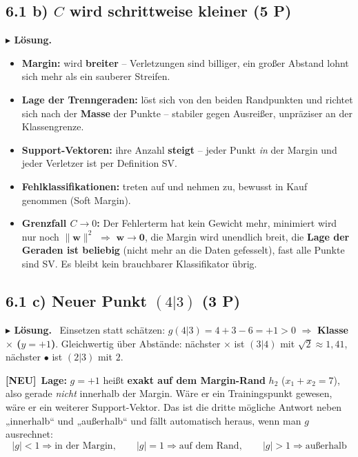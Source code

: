 \documentclass[10pt,a4paper]{article}
\newcommand{\pkt}[1]{\hfill\textbf{(#1 P)}}
\newcommand{\neu}{{\color{neurot}\footnotesize\bfseries[NEU]}\ }
\newenvironment{loes}%
  {\par\vspace{2pt}\begingroup\small\noindent\textbf{\color{loesfarbe}$\blacktriangleright$ Lösung.}\ }%
  {\endgroup\par\vspace{5pt}}
\begin{document}
\subsection*{6.1 b) $C$ wird schrittweise kleiner \pkt{5}}

\begin{loes}
\begin{itemize}
\item \textbf{Margin:} wird \textbf{breiter} -- Verletzungen sind billiger, ein großer Abstand
  lohnt sich mehr als ein sauberer Streifen.
\item \textbf{Lage der Trenngeraden:} löst sich von den beiden Randpunkten und richtet sich nach
  der \textbf{Masse} der Punkte -- stabiler gegen Ausreißer, unpräziser an der Klassengrenze.
\item \textbf{Support-Vektoren:} ihre Anzahl \textbf{steigt} -- jeder Punkt \emph{in} der Margin
  und jeder Verletzer ist per Definition SV.
\item \textbf{Fehlklassifikationen:} treten auf und nehmen zu, bewusst in Kauf genommen
  (Soft Margin).
\item \textbf{Grenzfall $C\to0$:} Der Fehlerterm hat kein Gewicht mehr, minimiert wird nur noch
  $\|\boldsymbol{w}\|^2$ $\Rightarrow$ $\boldsymbol{w}\to\boldsymbol{0}$, die Margin wird unendlich
  breit, die \textbf{Lage der Geraden ist beliebig} (nicht mehr an die Daten gefesselt), fast alle
  Punkte sind SV. Es bleibt kein brauchbarer Klassifikator übrig.
\end{itemize}
\end{loes}

\subsection*{6.1 c) Neuer Punkt $(4|3)$ \pkt{3}}

\begin{loes}
Einsetzen statt schätzen: $g(4|3) = 4+3-6 = +1 > 0$ $\Rightarrow$ \textbf{Klasse $\times$
($y=+1$)}. Gleichwertig über Abstände: nächster $\times$ ist $(3|4)$ mit $\sqrt2\approx1{,}41$,
nächster $\bullet$ ist $(2|3)$ mit $2$.

\neu \textbf{Lage:} $g = +1$ heißt \textbf{exakt auf dem Margin-Rand} $h_2$ ($x_1+x_2 = 7$), also
gerade \emph{nicht} innerhalb der Margin. Wäre er ein Trainingspunkt gewesen, wäre er ein weiterer
Support-Vektor. Das ist die dritte mögliche Antwort neben „innerhalb`` und „außerhalb`` und fällt
automatisch heraus, wenn man $g$ ausrechnet:
\[
|g| < 1 \Rightarrow \text{in der Margin}, \qquad
|g| = 1 \Rightarrow \text{auf dem Rand}, \qquad
|g| > 1 \Rightarrow \text{außerhalb}
\]
\end{loes}
\end{document}
